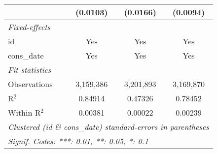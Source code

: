 \begin{tabular}{lccc}
                                                             & (0.0103)        & (0.0166)       & (0.0094)\\
   \midrule \emph{Fixed-effects} &   &   &  \\
   id                                                        & Yes             & Yes            & Yes\\
   cons\_date                                               & Yes             & Yes            & Yes\\
   \midrule \emph{Fit statistics} &   &   &  \\
   Observations                                              & 3,159,386       & 3,201,893      & 3,169,870\\
   R$^2$                                                     & 0.84914         & 0.47326        & 0.78452\\
   Within R$^2$                                              & 0.00381         & 0.00022        & 0.00239\\
   \midrule\midrule\multicolumn{4}{l}{\emph{Clustered (id \& cons\_date) standard-errors in parentheses}}\\
   \multicolumn{4}{l}{\emph{Signif. Codes: ***: 0.01, **: 0.05, *: 0.1}}\\
\end{tabular}



